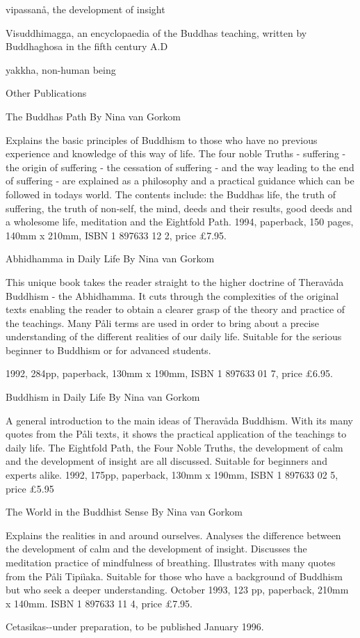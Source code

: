 \documentclass[12pt,twoside]{article}
\begin{document}
vipassan{\aa}, the development of insight

Visuddhimagga, an encyclopaedia of the Buddha{\textquotesingle}s
teaching, written by Buddhaghosa in the fifth century A.D

yakkha, non{}-human being

Other Publications


\bigskip

The Buddha{\textquotesingle}s Path By Nina van Gorkom

Explains the basic principles of Buddhism to those who have no previous
experience and knowledge of this way of life. The four noble Truths {}-
suffering {}- the origin of suffering {}- the cessation of suffering
{}- and the way leading to the end of suffering {}- are explained as a
philosophy and a practical guidance which can be followed in
today{\textquotesingle}s world. The contents include: the
Buddha{\textquotesingle}s life, the truth of suffering, the truth of
non{}-self, the mind, deeds and their results, good deeds and a
wholesome life, meditation and the Eightfold Path. 1994, paperback, 150
pages, 140mm x 210mm, ISBN 1 897633 12 2, price {\pounds}7.95. 


\bigskip

Abhidhamma in Daily Life By Nina van Gorkom

This unique book takes the reader straight to the higher doctrine of
Therav{\aa}da Buddhism {}- the Abhidhamma. It cuts through the
complexities of the original texts enabling the reader to obtain a
clearer grasp of the theory and practice of the teachings. Many
P{\aa}li terms are used in order to bring about a precise understanding
of the different realities of our daily life. Suitable for the serious
beginner to Buddhism or for advanced students. 

1992, 284pp, paperback, 130mm x 190mm, ISBN 1 897633 01 7, price
{\pounds}6.95.


\bigskip

Buddhism in Daily Life By Nina van Gorkom

A general introduction to the main ideas of Therav{\aa}da Buddhism. With
its many quotes from the P{\aa}li texts, it shows the practical
application of the teachings to daily life. The Eightfold Path, the
Four Noble Truths, the development of calm and the development of
insight are all discussed. Suitable for beginners and experts alike.
1992, 175pp, paperback, 130mm x 190mm, ISBN 1 897633 02 5, price
{\pounds}5.95


\bigskip

The World in the Buddhist Sense By Nina van Gorkom

Explains the realities in and around ourselves. Analyses the difference
between the development of calm and the development of insight.
Discusses the meditation practice of
{\textasciigrave}{\textasciigrave}mindfulness of
breathing{\textquotesingle}{\textquotesingle}. Illustrates with many
quotes from the P{\aa}li Tipi\`iaka. Suitable for those who have a
background of Buddhism but who seek a deeper understanding. October
1993, 123 pp, paperback, 210mm x 140mm. ISBN 1 897633 11 4, price
{\pounds}7.95.


\bigskip

Cetasikas{}-{}-under preparation, to be published January 1996.
\end{document}
